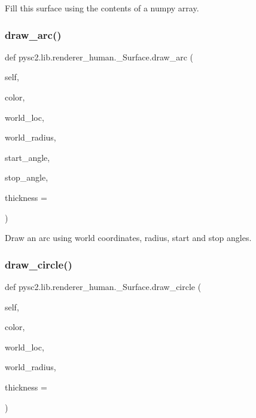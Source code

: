 \begin{DoxyVerb}Fill this surface using the contents of a numpy array.\end{DoxyVerb}
 \mbox{\label{classpysc2_1_1lib_1_1renderer__human_1_1___surface_a3147e67c55d537f3903e088ee03f7016}} 
\subsubsection{\texorpdfstring{draw\+\_\+arc()}{draw\_arc()}}
{\footnotesize\ttfamily def pysc2.\+lib.\+renderer\+\_\+human.\+\_\+\+Surface.\+draw\+\_\+arc (\begin{DoxyParamCaption}\item[{}]{self,  }\item[{}]{color,  }\item[{}]{world\+\_\+loc,  }\item[{}]{world\+\_\+radius,  }\item[{}]{start\+\_\+angle,  }\item[{}]{stop\+\_\+angle,  }\item[{}]{thickness = {} }\end{DoxyParamCaption})}

\begin{DoxyVerb}Draw an arc using world coordinates, radius, start and stop angles.\end{DoxyVerb}
 \mbox{\label{classpysc2_1_1lib_1_1renderer__human_1_1___surface_a0dbda25a5a85520c8740e0d2a232848b}} 
\subsubsection{\texorpdfstring{draw\+\_\+circle()}{draw\_circle()}}
{\footnotesize\ttfamily def pysc2.\+lib.\+renderer\+\_\+human.\+\_\+\+Surface.\+draw\+\_\+circle (\begin{DoxyParamCaption}\item[{}]{self,  }\item[{}]{color,  }\item[{}]{world\+\_\+loc,  }\item[{}]{world\+\_\+radius,  }\item[{}]{thickness = {} }\end{DoxyParamCaption})}

